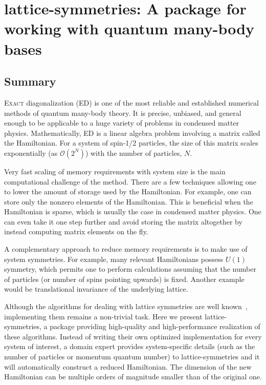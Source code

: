 \openleft%
\chapter{lattice-symmetries: A package for working with quantum many-body bases}\label{ch:ls21}

\clearpage

\section{Summary}

\lettrine[lines=3]{E}{xact} diagonalization (ED) is one of the most reliable and established numerical methods of quantum many-body theory. It is precise, unbiased, and general enough to be applicable to a huge variety of problems in condensed matter physics. Mathematically, ED is a linear algebra problem involving a matrix called the Hamiltonian. For a system of spin-1/2 particles, the size of this matrix scales exponentially (as $\mathcal{O}(2^N)$) with the number of particles, $N$.

Very fast scaling of memory requirements with system size is the main computational challenge of the method. There are a few techniques allowing one to lower the amount of storage used by the Hamiltonian. For example, one can store only the nonzero elements of the Hamiltonian. This is beneficial when the Hamiltonian is sparse, which is usually the case in condensed matter physics. One can even take it one step further and avoid storing the matrix altogether by instead computing matrix elements on the fly.

A complementary approach to reduce memory requirements is to make use of system symmetries. For example, many relevant Hamiltonians possess $U(1)$ symmetry, which permits one to perform calculations assuming that the number of particles (or number of spins pointing upwards) is fixed. Another example would be translational invariance of the underlying lattice.

Although the algorithms for dealing with lattice symmetries are well known~\cite{Sandvi2010ComputationalS}, implementing them remains a non-trivial task. Here we present lattice-symmetries, a package providing high-quality and high-performance realization of these algorithms. Instead of writing their own optimized implementation for every system of interest, a domain expert provides system-specific details (such as the number of particles or momentum quantum number) to lattice-symmetries and it will automatically construct a reduced Hamiltonian. The dimension of the new Hamiltonian can be multiple orders of magnitude smaller than of the original one.

